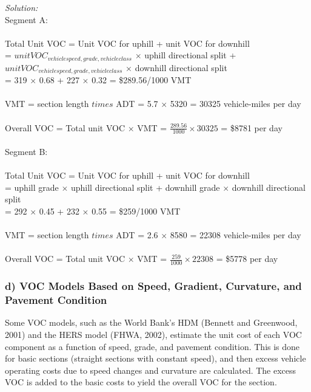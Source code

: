 \textit{Solution:}\\
Segment A:\\\\
Total Unit VOC = Unit VOC for uphill + unit VOC for downhill\\
\hspace*{2cm} = $ unitVOC_{vehicle speed, grade, vehicle class} $ $ \times $ uphill directional split + $ unitVOC_{vehicle speed, grade, vehicle class} $ $ \times $ downhill directional split\\
\hspace*{2cm} = 319 $ \times $ 0.68 + 227 $ \times $ 0.32 = \$289.56/1000 VMT\\\\
VMT = section length $ times $ ADT = 5.7 $ \times $ 5320 = 30325 vehicle-miles per day\\\\
Overall VOC = Total unit VOC $ \times$ VMT = $ \frac{289.56}{1000} \times 30325 $ = \$8781 per day\\\\
Segment B:\\\\
Total Unit VOC = Unit VOC for uphill + unit VOC for downhill\\
\hspace*{2cm} = uphill grade $ \times $ uphill directional split + downhill grade $ \times $ downhill directional split\\
\hspace*{2cm} = 292 $ \times $ 0.45 + 232 $ \times $ 0.55 = \$259/1000 VMT\\\\
VMT = section length $ times $ ADT = 2.6 $ \times $ 8580 = 22308 vehicle-miles per day\\\\
Overall VOC = Total unit VOC $ \times$ VMT = $ \frac{259}{1000} \times 22308 $ = \$5778 per day
\subsubsection{d) VOC Models Based on Speed, Gradient, Curvature, and Pavement Condition}
Some VOC models, such as the World Bank’s HDM (Bennett and Greenwood, 2001) and the HERS model (FHWA, 2002), estimate the unit cost of each VOC component as a function of speed, grade, and pavement condition. This is done for basic sections (straight sections with constant speed), and then excess vehicle operating costs due to speed changes and curvature are calculated. The excess VOC is added to the basic costs to yield the overall VOC for the section.
